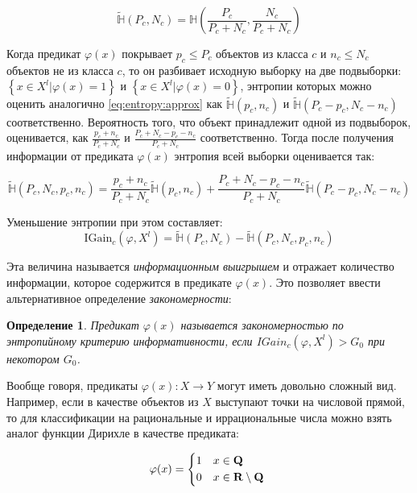 \documentclass[12pt]{article}
\newtheorem{definition}{Определение}
\begin{document}
\begin{equation}\label{eq:entropy:approx}
\tilde{\mathbb{H}}(P_c, N_c) =
\mathbb{H}\left(\frac{P_c}{P_c+N_c},\frac{N_c}{P_c+N_c}\right)
\end{equation}

Когда предикат \(\varphi(x)\) покрывает \(p_c\leq P_c\) объектов из
класса \(c\) и \(n_c\leq N_c\) объектов не из класса \(c\), то он
разбивает исходную выборку на две подвыборки: \(\left\{x\in X^l |
\varphi(x) = 1\right\}\) и \(\left\{x\in X^l | \varphi(x) =
0\right\}\), энтропии которых можно оценить аналогично
\ref{eq:entropy:approx} как \(\tilde{\mathbb{H}}(p_c, n_c)\) и
\(\tilde{\mathbb{H}}(P_c - p_c, N_c - n_c)\)
соответственно. Вероятность того, что объект принадлежит одной из
подвыборок, оценивается, как \(\frac{p_c + n_c}{P_c + N_c}\) и
\(\frac{P_c + N_c - p_c - n_c}{P_c + N_c}\) соответственно. Тогда
после получения информации от предиката \(\varphi(x)\) энтропия всей
выборки оценивается так:

\[
\tilde{\mathbb{H}}(P_c, N_c, p_c, n_c) =
\frac{p_c + n_c}{P_c + N_c}\tilde{\mathbb{H}}(p_c, n_c) +
\frac{P_c+N_c-p_c-n_c}{P_c+N_c}\tilde{\mathbb{H}}(P_c - p_c, N_c - n_c)
\]

Уменьшение энтропии при этом составляет:
\[
\text{IGain}_c(\varphi, X^l) =
\tilde{\mathbb{H}}(P_c, N_c) - \tilde{\mathbb{H}}(P_c, N_c, p_c, n_c)
\]

Эта величина называется \emph{информационным выигрышем} и отражает
количество информации, которое содержится в предикате
\(\varphi(x)\). Это позволяет ввести альтернативное определение
\emph{закономерности}:

\begin{definition}
  Предикат \(\varphi(x)\) называется \emph{закономерностью} по
  энтропийному критерию информативности, если \(IGain_c (\varphi, X^l)
  > G_0\) при некотором \(G_0\).
\end{definition}

Вообще говоря, предикаты \(\varphi(x)\colon X \rightarrow Y\) могут
иметь довольно сложный вид. Например, если в качестве объектов из
\(X\) выступают точки на числовой прямой, то для классификации на
рациональные и иррациональные числа можно взять аналог функции Дирихле
в качестве предиката:

\[
\varphi(x) =
\begin{dcases*}
1 & \(x \in \mathbf{Q}\) \\
0 & \(x \in \mathbf{R} \setminus \mathbf{Q}\)
\end{dcases*}
\]
\end{document}
